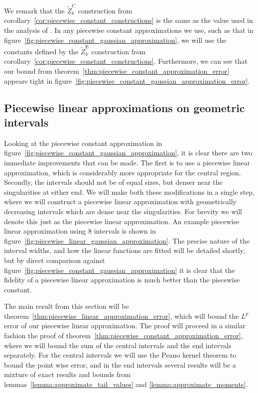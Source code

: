 \documentclass[9pt,a4paper,english]{extarticle}
\begin{document}
We remark that the $ \widetilde{Z}_k^\mathrm{C} $ construction from corollary~\ref{cor:piecewise_constant_constructions} is the same as the value used in the analysis of \citet[(4)]{giles2019random_quadrature}. In any piecewise constant approximations we use, such as that in figure~\ref{fig:piecewise_constant_gaussian_approximation}, we will use the constants defined by  the $ \widetilde{Z}_k^\mathrm{E} $ construction from corollary~\ref{cor:piecewise_constant_constructions}. Furthermore, we can see that our bound from theorem~\ref{thm:piecewise_constant_approximation_error} appears tight in figure~\ref{fig:piecewise_constant_gaussian_approximation_error}.

\subsection{Piecewise linear approximations on geometric intervals}
\label{sec:piecewise_linear_approximations_on_geometric_intervals}

Looking at the piecewise constant approximation in figure~\ref{fig:piecewise_constant_gaussian_approximation}, it is clear there are two immediate improvements that can be made. The first is to use a piecewise linear approximation, which is considerably more appropriate for the central region. Secondly, the intervals should not be of equal sizes, but denser near the singularities at either end. We will make both these modifications in a single step, where we will construct a piecewise linear approximation with geometrically decreasing intervals which are dense near the singularities. For brevity we will denote this just as the piecewise linear approximation. An example piecewise linear approximation using 8 intervals is shown in figure~\ref{fig:piecewise_linear_gaussian_approximation}. The precise nature of the interval widths, and how the linear functions are fitted will be detailed shortly, but by direct comparison against figure~\ref{fig:piecewise_constant_gaussian_approximation} it is clear that the fidelity of a piecewise linear approximation is much better than the piecewise constant. 

The main result from this section will be theorem~\ref{thm:piecewise_linear_approximation_error}, which will bound the $ L^p $ error of our piecewise linear approximation. The proof will proceed in a similar fashion the proof of theorem~\ref{thm:piecewise_constant_approximation_error}, where we will bound the sum of the central intervals and the end intervals separately. For the central intervals we will use the Peano kernel theorem to bound the point wise error, and in the end intervals several results will be a mixture of exact results and bounds from lemmas~\ref{lemma:approximate_tail_values} and \ref{lemma:approximate_moments}.
\end{document}
